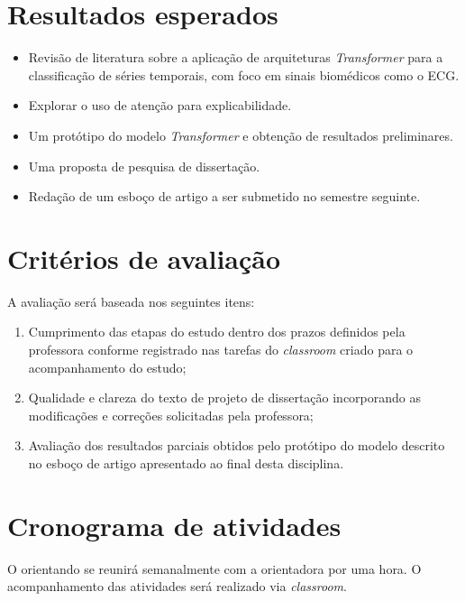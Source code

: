 \documentclass[12pt]{article}
\begin{document}
\section{Resultados esperados} 

\begin{itemize}
  
  \item Revisão de literatura sobre a aplicação de arquiteturas \textit{Transformer} para a classificação de séries temporais, com foco em sinais biomédicos como o ECG.

  \item Explorar o uso de atenção para explicabilidade.

  \item Um protótipo do modelo \textit{Transformer} e obtenção de resultados preliminares.

  \item Uma proposta de pesquisa de dissertação.

  \item Redação de um esboço de artigo a ser submetido no semestre seguinte.
  
\end{itemize} 

\section{Critérios de avaliação} 

A avaliação será baseada nos seguintes itens:
\begin{enumerate}   

\item Cumprimento das etapas do estudo dentro dos prazos definidos pela professora conforme registrado nas tarefas do \textit{classroom} criado para o acompanhamento do estudo; 
\item Qualidade e clareza do texto de projeto de dissertação incorporando as modificações e correções solicitadas pela professora; 
\item Avaliação dos resultados parciais obtidos pelo protótipo do modelo descrito no esboço de artigo apresentado ao final desta disciplina.
\end{enumerate}

\section{Cronograma de atividades}

O orientando se reunirá semanalmente com a orientadora por uma hora. O acompanhamento das atividades será realizado via \textit{classroom}.
\end{document}
